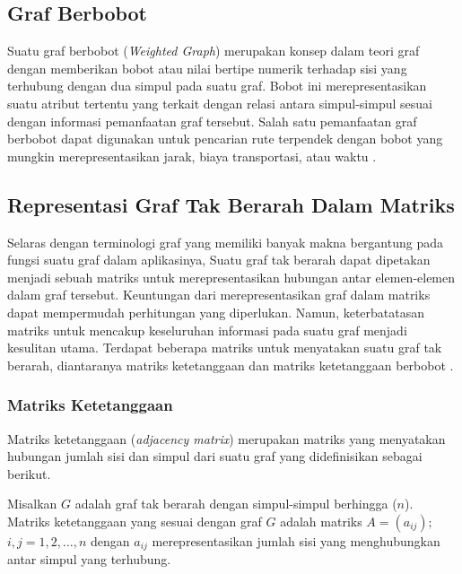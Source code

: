 {    %
    \vspace{-5mm}
    \subsection{Graf Berbobot}
    {\frenchspacing
        Suatu graf berbobot (\textit{Weighted Graph}) merupakan konsep dalam teori graf dengan memberikan bobot atau
        nilai bertipe numerik terhadap sisi yang terhubung dengan dua simpul pada suatu graf.
        Bobot ini merepresentasikan suatu atribut tertentu yang terkait dengan relasi antara simpul-simpul sesuai
        dengan informasi pemanfaatan graf tersebut.
        Salah satu pemanfaatan graf berbobot dapat digunakan untuk pencarian rute terpendek dengan bobot yang mungkin
        merepresentasikan jarak, biaya transportasi, atau waktu .
    }

    \vspace{-5mm}
    \subsection{Representasi Graf Tak Berarah Dalam Matriks}
    {\frenchspacing
        Selaras dengan terminologi graf yang memiliki banyak makna bergantung pada fungsi suatu graf dalam aplikasinya,
        Suatu graf tak berarah dapat dipetakan menjadi sebuah matriks untuk merepresentasikan hubungan antar elemen-elemen dalam graf tersebut.
        Keuntungan dari merepresentasikan graf dalam matriks dapat mempermudah perhitungan yang diperlukan.
        Namun, keterbatatasan matriks untuk mencakup keseluruhan informasi pada suatu graf menjadi kesulitan utama.
        Terdapat beberapa matriks untuk menyatakan suatu graf tak berarah, diantaranya matriks ketetanggaan dan matriks ketetanggaan berbobot .

        \vspace{-5mm}
        \subsubsection{Matriks Ketetanggaan}
        {\frenchspacing
            Matriks ketetanggaan (\textit{adjacency matrix}) merupakan matriks yang menyatakan hubungan jumlah sisi dan simpul dari suatu graf yang didefinisikan sebagai berikut.

            \begin{definisi}
                \label{def:Matriks ketetanggaan}
                Misalkan $G$ adalah graf tak berarah dengan simpul-simpul berhingga ($n$).
                Matriks ketetanggaan yang sesuai dengan graf $G$ adalah matriks $A=(a_{ij});$ $i,j=1,2,\dots,n$ dengan $a_{ij}$ merepresentasikan jumlah sisi yang menghubungkan antar simpul yang terhubung.
            \end{definisi}

}}}
